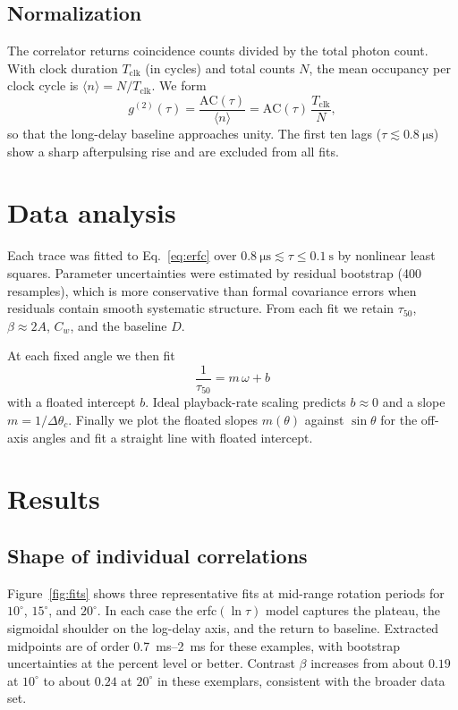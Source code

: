 \documentclass[11pt,letterpaper]{article}
\newcommand{\gtt}{g^{(2)}}
\begin{document}
\subsection{Normalization}

The correlator returns coincidence counts divided by the total photon count.
With clock duration $T_{\mathrm{clk}}$ (in cycles) and total counts $N$, the
mean occupancy per clock cycle is $\langle n\rangle=N/T_{\mathrm{clk}}$. We form
\begin{equation}
  \gtt(\tau)
  =
  \frac{\mathrm{AC}(\tau)}{\langle n\rangle}
  =
  \mathrm{AC}(\tau)\,\frac{T_{\mathrm{clk}}}{N},
\end{equation}
so that the long-delay baseline approaches unity. The first ten lags
($\tau\lesssim\SI{0.8}{\micro\second}$) show a sharp afterpulsing rise and are
excluded from all fits.

\section{Data analysis}
\label{sec:analysis}

Each trace was fitted to Eq.~\eqref{eq:erfc} over
$\SI{0.8}{\micro\second}\lesssim\tau\le\SI{0.1}{\second}$ by nonlinear least
squares. Parameter uncertainties were estimated by residual bootstrap
(400 resamples), which is more conservative than formal covariance errors when
residuals contain smooth systematic structure. From each fit we retain
$\tau_{50}$, $\beta\approx 2A$, $C_w$, and the baseline $D$.

At each fixed angle we then fit
\begin{equation}
  \frac{1}{\tau_{50}}
  =
  m\,\omega + b
  \label{eq:line}
\end{equation}
with a floated intercept $b$. Ideal playback-rate scaling predicts $b\approx 0$
and a slope $m=1/\Delta\theta_c$. Finally we plot the floated slopes $m(\theta)$
against $\sin\theta$ for the off-axis angles and fit a straight line with floated
intercept.

\section{Results}
\label{sec:results}

\subsection{Shape of individual correlations}

Figure~\ref{fig:fits} shows three representative fits at mid-range rotation
periods for $10^\circ$, $15^\circ$, and $20^\circ$. In each case the erfc$(\ln\tau)$
model captures the plateau, the sigmoidal shoulder on the log-delay axis, and
the return to baseline. Extracted midpoints are of order
\SIrange{0.7}{2}{\milli\second} for these examples, with bootstrap
uncertainties at the percent level or better. Contrast $\beta$ increases from
about $0.19$ at $10^\circ$ to about $0.24$ at $20^\circ$ in these exemplars,
consistent with the broader data set.
\end{document}
